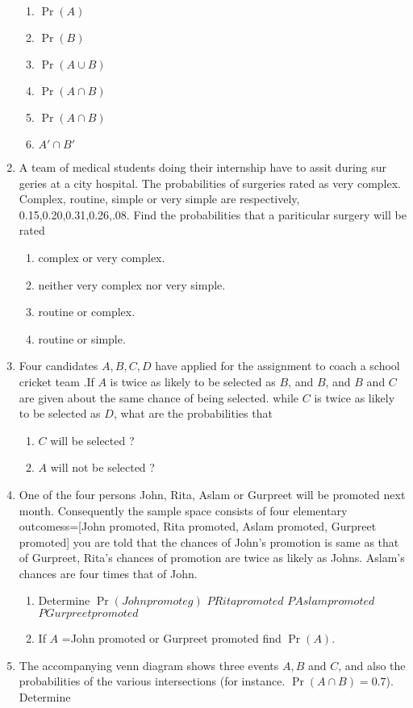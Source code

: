 \documentclass[12pt]{article}
\providecommand{\pr}[1]{\ensuremath{\Pr\left(#1\right)}}
\begin{document}
\begin{enumerate}
\begin{enumerate}
\item $\pr{A}$
\item $\pr{B}$
\item $\pr{A\cup B}$
\item $\pr{A\cap B}$
\item $\pr{A\cap B}$
\item ${A\prime\cap B\prime}$
\end{enumerate}
\item A team of medical students doing their internship have to assit during sur geries at a city hospital. The probabilities of surgeries rated as very complex. Complex, routine, simple or very simple are respectively, 0.15,0.20,0.31,0.26,.08. Find the probabilities that a pariticular surgery will be rated
\begin{enumerate}
\item complex or very complex.
\item neither very complex nor very simple.
\item routine or complex. 
\item routine or simple.
\end{enumerate}
\item Four candidates $A,B,C,D$ have applied for the assignment to coach a school cricket team .If $A$ is twice as likely to be selected as $B$, and $B$, and $B$ and $C$ are given about the same chance of being selected. while $C$ is twice as likely to be selected as $D$, what are the probabilities that
\begin{enumerate}
\item $C$ will be selected ?
\item $A$ will not be selected ?
\end{enumerate}
\item One of the four persons John, Rita, Aslam or Gurpreet will be promoted next month. Consequently the sample space consists of four elementary outcomess=[John promoted, Rita promoted, Aslam promoted, Gurpreet promoted] you are told that the chances of John's promotion is same as that of Gurpreet, Rita's chances of promotion are twice as likely as Johns. Aslam's chances are four times that of John.
\begin{enumerate}
\item Determine $\pr{John promoteg}$
$P {Rita promoted}$
$P {Aslam promoted}$
$P {Gurpreet promoted}$
\item If $A$ ={John promoted or Gurpreet promoted} find $\pr{A}$.
\end{enumerate}
\item The accompanying venn diagram shows three events $A,B$ and $C$, and also the probabilities of the various intersections (for instance. $\pr {A\cap B} =0.7$). Determine

\end{enumerate}
\end{document}

